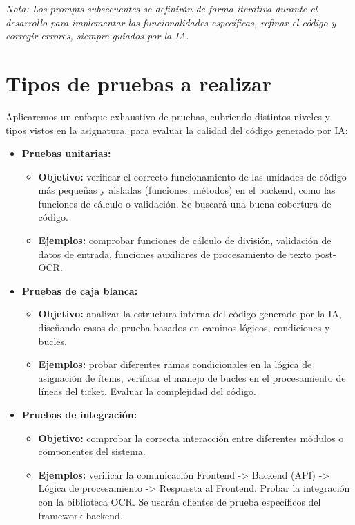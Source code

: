 \documentclass[a4paper, 11pt]{article}
\begin{document}
\textit{Nota: Los prompts subsecuentes se definirán de forma iterativa durante el desarrollo para implementar las funcionalidades específicas, refinar el código y corregir errores, siempre guiados por la IA.}

\section{Tipos de pruebas a realizar}

Aplicaremos un enfoque exhaustivo de pruebas, cubriendo distintos niveles y tipos vistos en la asignatura, para evaluar la calidad del código generado por IA:

\begin{itemize}
    \item \textbf{Pruebas unitarias:}
        \begin{itemize}
            \item \textbf{Objetivo:} verificar el correcto funcionamiento de las unidades de código más pequeñas y aisladas (funciones, métodos) en el backend, como las funciones de cálculo o validación. Se buscará una buena cobertura de código.
            \item \textbf{Ejemplos:} comprobar funciones de cálculo de división, validación de datos de entrada, funciones auxiliares de procesamiento de texto post-OCR.
        \end{itemize}
    \item \textbf{Pruebas de caja blanca:}
        \begin{itemize}
            \item \textbf{Objetivo:} analizar la estructura interna del código generado por la IA, diseñando casos de prueba basados en caminos lógicos, condiciones y bucles.
            \item \textbf{Ejemplos:} probar diferentes ramas condicionales en la lógica de asignación de ítems, verificar el manejo de bucles en el procesamiento de líneas del ticket. Evaluar la complejidad del código.
        \end{itemize}
    \item \textbf{Pruebas de integración:}
        \begin{itemize}
            \item \textbf{Objetivo:} comprobar la correcta interacción entre diferentes módulos o componentes del sistema.
            \item \textbf{Ejemplos:} verificar la comunicación Frontend -> Backend (API) -> Lógica de procesamiento -> Respuesta al Frontend. Probar la integración con la biblioteca OCR. Se usarán clientes de prueba específicos del framework backend.

\end{itemize}
\end{itemize}
\end{document}
